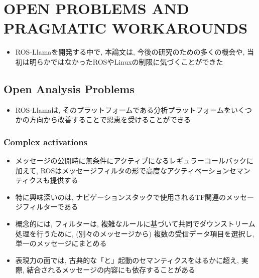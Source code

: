 
\section{OPEN PROBLEMS AND PRAGMATIC WORKAROUNDS}
\label{sec: open problems and pragmatic workarounds}

\begin{frame}{}
    \begin{itemize}
        \item ROS-Llamaを開発する中で, 本論文は, 今後の研究のための多くの機会や, 当初は明らかではなかったROSやLinuxの制限に気づくことができた
    \end{itemize}
\end{frame}


\subsection{Open Analysis Problems}
\label{ssec: open analysis problems}

\begin{frame}{}
    \begin{itemize}
        \item ROS-Llamaは, そのプラットフォームである分析プラットフォームをいくつかの方向から改善することで恩恵を受けることができる
    \end{itemize}
\end{frame}


\subsubsection{Complex activations}
\label{sssec: complex activations}

\begin{frame}{}
    \begin{itemize}
        \item メッセージの公開時に無条件にアクティブになるレギュラーコールバックに加えて, ROSはメッセージフィルタの形で高度なアクティベーションセマンティクスも提供する
        \item 特に興味深いのは, ナビゲーションスタックで使用されるTF関連のメッセージフィルターである
        \item 概念的には, フィルターは, 複雑なルールに基づいて共同でダウンストリーム処理を行うために,  (別々のメッセージから) 複数の受信データ項目を選択し, 単一のメッセージにまとめる
        \item 表現力の面では, 古典的な「と」起動のセマンティクスをはるかに超え, 実際, 結合されるメッセージの内容にも依存することがある
    \end{itemize}
\end{frame}

